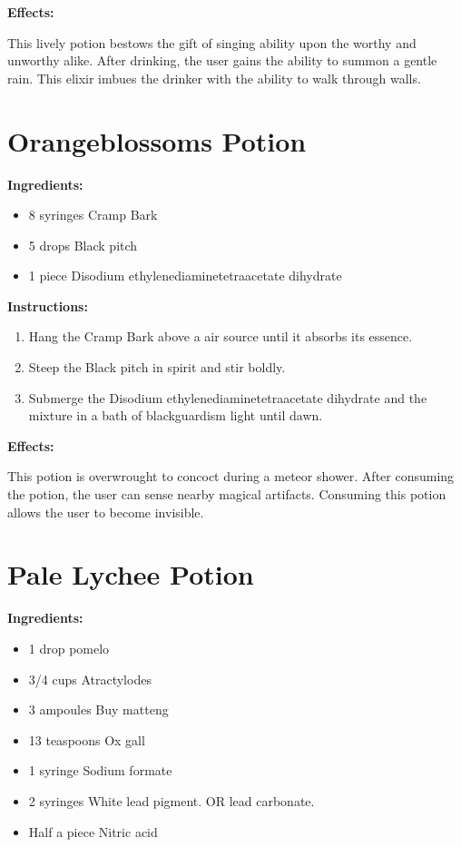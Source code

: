 \documentclass{article}
\begin{document}
\textbf{Effects:}

This lively potion bestows the gift of singing ability upon the worthy and unworthy alike. After drinking, the user gains the ability to summon a gentle rain. This elixir imbues the drinker with the ability to walk through walls.

\newpage
\section*{Orangeblossoms Potion}

\textbf{Ingredients:}

\begin{itemize}
  \item 8 syringes Cramp Bark
  \item 5 drops Black pitch
  \item 1 piece Disodium ethylenediaminetetraacetate dihydrate
\end{itemize}

\textbf{Instructions:}

\begin{enumerate}
  \item Hang the Cramp Bark above a air source until it absorbs its essence.
  \item Steep the Black pitch in spirit and stir boldly.
  \item Submerge the Disodium ethylenediaminetetraacetate dihydrate and the mixture in a bath of blackguardism light until dawn.
\end{enumerate}

\textbf{Effects:}

This potion is overwrought to concoct during a meteor shower. After consuming the potion, the user can sense nearby magical artifacts. Consuming this potion allows the user to become invisible.

\newpage
\section*{Pale Lychee Potion}

\textbf{Ingredients:}

\begin{itemize}
  \item 1 drop pomelo
  \item 3/4 cups Atractylodes
  \item 3 ampoules Buy matteng
  \item 13 teaspoons Ox gall
  \item 1 syringe Sodium formate
  \item 2 syringes White lead pigment. OR lead carbonate.
  \item Half a piece Nitric acid
\end{itemize}
\end{document}
